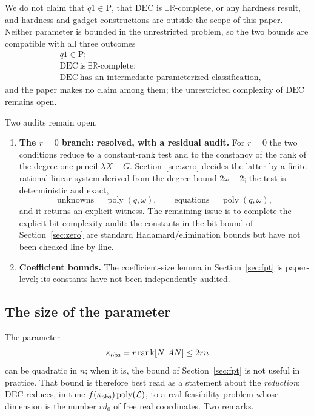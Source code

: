 We do not claim that $q1\in\mathrm P$, that $\mathrm{DEC}$ is $\exists\mathbb R$-complete, or any hardness result, and hardness and gadget constructions are outside the scope of this paper. Neither parameter is bounded in the unrestricted problem, so the two bounds are compatible with all three outcomes
\begin{equation*}
\begin{aligned}
&q1\in\mathrm P;\\
&\mathrm{DEC}\ \text{is}\ \exists\mathbb R\text{-complete};\\
&\mathrm{DEC}\ \text{has an intermediate parameterized classification},
\end{aligned}
\end{equation*}
and the paper makes no claim among them; the unrestricted complexity of $\mathrm{DEC}$ remains open.

Two audits remain open.
\begin{enumerate}
\item \textbf{The $r=0$ branch: resolved, with a residual audit.} For $r=0$ the two conditions reduce to a constant-rank test and to the constancy of the rank of the degree-one pencil $\lambda X-G$. Section~\ref{sec:zero} decides the latter by a finite rational linear system derived from the degree bound $2\omega-2$; the test is deterministic and exact,
\begin{equation*}
\text{unknowns}=\operatorname{poly}(q,\omega),\qquad
\text{equations}=\operatorname{poly}(q,\omega),
\end{equation*}
and it returns an explicit witness. The remaining issue is to complete the explicit bit-complexity audit: the constants in the bit bound of Section~\ref{sec:zero} are standard Hadamard/elimination bounds but have not been checked line by line.
\item \textbf{Coefficient bounds.} The coefficient-size lemma in Section~\ref{sec:fpt} is paper-level; its constants have not been independently audited.
\end{enumerate}

\subsection{The size of the parameter}\label{sec:paramsize}

The parameter
\begin{equation*}
\kappa_{\rm obs}=r\operatorname{rank}[N\ AN]\le2rn
\end{equation*}
can be quadratic in $n$; when it is, the bound of Section~\ref{sec:fpt} is not useful in practice. That bound is therefore best read as a statement about the \emph{reduction}: $\mathrm{DEC}$ reduces, in time $f(\kappa_{\rm obs})\operatorname{poly}(\mathcal L)$, to a real-feasibility problem whose dimension is the number $rd_0$ of free real coordinates. Two remarks.

